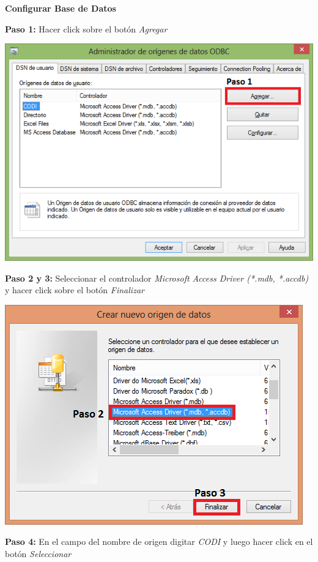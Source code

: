 \documentclass[12pt]{article}
\begin{document}
	\begin{center}
		\huge \textbf{Configurar Base de Datos}
	\end{center}
	\large \textbf{Paso 1:} Hacer click sobre el botón \textit{Agregar}
	\begin{center}
		\includegraphics{Paso1}
	\end{center}
	\newpage
	\large \textbf{Paso 2 y 3:} Seleccionar el controlador \textit{Microsoft Access Driver (*.mdb, *.accdb)} y hacer click sobre el botón \textit{Finalizar}
	\begin{center}
		\includegraphics{Paso2y3}
	\end{center}
	\large \textbf{Paso 4:} En el campo del nombre de origen digitar \textit{CODI} y luego hacer click en el botón \textit{Seleccionar}
\end{document}
